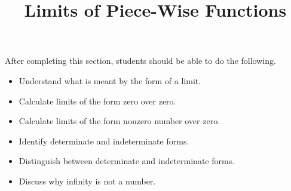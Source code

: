 \documentclass{ximera}
\title{Limits of Piece-Wise Functions}
\begin{document}
\begin{abstract}
\end{abstract}
\maketitle

\begin{sectionOutcomes}
After completing this section, students should be able to do the following. %

\begin{itemize}
\item Understand what is meant by the form of a limit.
\item Calculate limits of the form zero over zero.
\item Calculate limits of the form nonzero number over zero.
\item Identify determinate and indeterminate forms.
\item Distinguish between determinate and indeterminate forms.
\item Discuss why infinity is not a number.
\end{itemize}
\end{sectionOutcomes}
\end{document}
